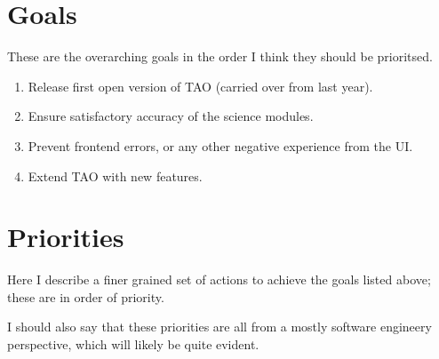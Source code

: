 \documentclass[12pt]{scrartcl}
\begin{document}
\maketitle

\section{Goals}

These are the overarching goals in the order I think they should be
prioritsed.

\begin{enumerate}
  \item Release first open version of TAO (carried over from last
    year).
  \item Ensure satisfactory accuracy of the science modules.
  \item Prevent frontend errors, or any other negative experience from
    the UI.
  \item Extend TAO with new features.
\end{enumerate}

\section{Priorities}

Here I describe a finer grained set of actions to achieve the goals
listed above; these are in order of priority.

I should also say that these priorities are all from a mostly software
engineery perspective, which will likely be quite evident.
\end{document}
